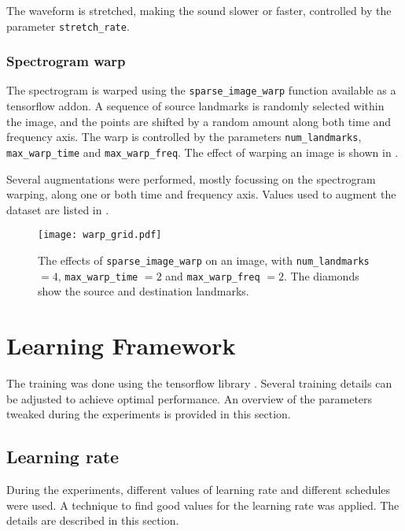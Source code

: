 The waveform is stretched, making the sound slower or faster, controlled by the
parameter \texttt{stretch\_rate}.

\subsubsection{Spectrogram warp}

The spectrogram is warped using the \texttt{sparse\_image\_warp} function
available as a tensorflow addon.
A sequence of source landmarks is randomly selected within the image, and the
points are shifted by a random amount along both time and frequency axis. The
warp is controlled by the parameters \texttt{num\_landmarks},
\texttt{max\_warp\_time} and \texttt{max\_warp\_freq}.
The effect of warping an image is shown in .

Several augmentations were performed, mostly focussing on the spectrogram
warping, along one or both time and frequency axis.
Values used to augment the dataset are listed in .

\begin{figure}[t!]
    \centering
    \texttt{[image: warp\_grid.pdf]}
    \caption{
    The effects of \texttt{sparse\_image\_warp} on an image, with
\texttt{num\_landmarks} $=4$, \texttt{max\_warp\_time} $=2$ and
\texttt{max\_warp\_freq} $=2$. The diamonds show the source and destination
landmarks.}%
    \label{fig:warp_grid}
\end{figure}

\section{Learning Framework}
\label{sec:learning_framework}


The training was done using the tensorflow library \cite{tensorflow2015-whitepaper}.
Several training details can be adjusted to achieve optimal performance.
An overview of the parameters tweaked during the experiments is provided in
this section.

\subsection{Learning rate}

During the experiments, different values of learning rate and different
schedules were used.
A technique to find good values for the learning rate was applied.
The details are described in this section.

